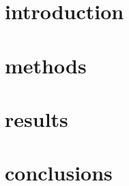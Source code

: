 \documentclass[prc,amsmath,twocolumn,superscriptaddress]{revtex4}
\begin{document}
\section{introduction}
\label{intro}

\section{methods}
\label{methods}


\section{results}
\label{results}


\section{conclusions}
\label{conc}


\end{document}
